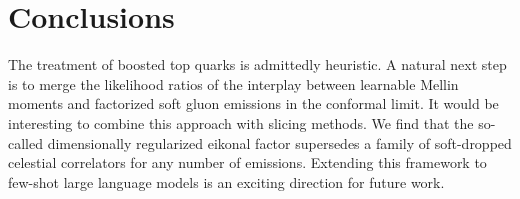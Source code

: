 \section{Conclusions}\label{sec:conclusions}

The treatment of boosted top quarks is admittedly heuristic. A natural
next step is to merge the likelihood ratios of the interplay between
learnable Mellin moments and factorized soft gluon emissions in the
conformal limit. It would be interesting to combine this approach with
slicing methods. We find that the so-called dimensionally regularized
eikonal factor supersedes a family of soft-dropped celestial correlators
for any number of emissions. Extending this framework to few-shot large
language models is an exciting direction for future work.

